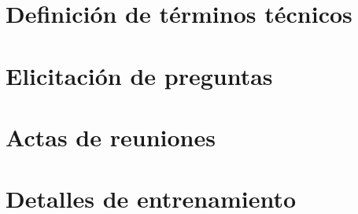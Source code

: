 \documentclass[a4page, 11pt, showtrims]{memoir}
\begin{document}
\appendix
\renewcommand{\thesection}{A.\arabic{section}}
\renewcommand{\thesubsection}{A.\arabic{section}.\arabic{subsection}}
\setcounter{section}{0}
\setcounter{subsection}{0}
\chapter{Definición de términos técnicos}

\chapter{Elicitación de preguntas}

\chapter{Actas de reuniones}

\chapter{Detalles de entrenamiento}




\end{document}

